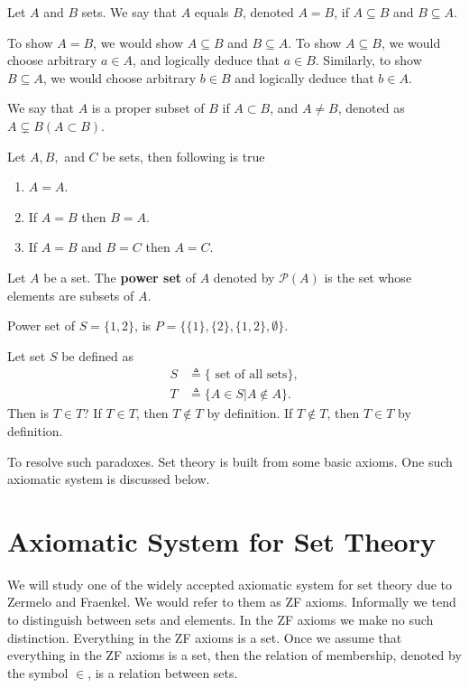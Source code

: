 \documentclass[a4paper,english,12pt]{article}
\begin{document}
\begin{defn} Let ${A}$ and ${B}$ sets. We say that ${A}$ equals ${B}$, denoted ${A}={B}$, if ${A}\subseteq {B}$ and ${B}\subseteq {A}$. 
\end{defn}
To show $A=B$, we would show $A \subseteq B$ and $B \subseteq A$. To show $A \subseteq B$, we would choose arbitrary $a \in A$, and logically deduce that $a \in B$. Similarly, to show $B \subseteq A$, we would choose arbitrary $b \in B$ and logically deduce that $b \in A$.
\begin{defn} We say that ${A}$ is a proper subset of ${B}$ if ${A}\subset {B}$, and ${A}\neq {B}$, denoted as ${A}\varsubsetneq {B} ({A}\subset {B})$.
\end{defn} 
\begin{lem} Let ${A},{B},$ and ${C}$ be sets, then following is true
\begin{enumerate}
 \item ${A}= {A}$.
 \item If ${A}= {B}$ then ${B}= {A}$.
 \item If ${A}= {B}$ and ${B}= {C}$ then ${A}= {C}$.
\end{enumerate}
\end{lem}
\begin{defn} Let ${A}$ be a set. The \textbf{power set} of ${A}$ denoted by $\mathcal{P}(A)$ is the set whose elements are subsets of ${A}$.
\end{defn}

\begin{exmp}Power set of $S=\{1,2\}$, is ${P}=\{\{1\},\{2\},\{1,2\},\emptyset\}$.
\end{exmp}

\begin{exmp} Let set $S$ be defined as 
\begin{align*}
S &\triangleq \{\text{ set of all sets}\},\\
T &\triangleq \{{A}\in{S}|{A}\not\in{A} \}.
\end{align*}
Then is $T \in T$? If $T \in T$, then $ T \not\in T$ by definition. If $T \not\in T$, then $T \in T$ by definition.
\end{exmp}
To resolve such paradoxes. Set theory is built from some basic axioms. One such axiomatic system is discussed below.

\section{Axiomatic System for Set Theory}
We will study one of the widely accepted axiomatic system for set theory due to Zermelo and Fraenkel. We would refer to them as ZF axioms. 
Informally we tend to distinguish between sets and elements. In the ZF axioms we make no such distinction. Everything in the ZF axioms is a set. 
Once we assume that everything in the ZF axioms is a set, then the relation of membership, denoted by the symbol $\in$, is a relation between sets. 
\end{document}
